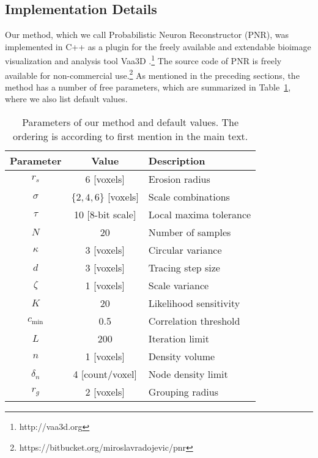 \subsection{Implementation Details}
\label{subsec:implementation}
Our method, which we call Probabilistic Neuron Reconstructor (PNR), was implemented in C++ as a plugin for the freely available and extendable bioimage visualization and analysis tool Vaa3D \citep{peng2010v3d, peng2014extensible}.\footnote{http://vaa3d.org} The source code of PNR is freely available for non-commercial use.\footnote{https://bitbucket.org/miroslavradojevic/pnr} As mentioned in the preceding sections, the method has a number of free parameters, which are summarized in Table~\ref{tab:params}, where we also list default values.

\begin{table}[t!]
\small\centering
\begin{tabular}{@{}c@{\hspace{1em}}c@{\hspace{2em}}l@{}}
\hline
Parameter & Value & Description \\
\hline
$r_s$ & 6 [voxels] & Erosion radius \\
$\sigma$ & $\{ 2,4,6 \}$ [voxels]  & Scale combinations \\ %
$\tau$ & 10 [8-bit scale] & Local maxima tolerance \\ %
$N$ & 20 & Number of samples \\
$\kappa$ & 3 [voxels] & Circular variance \\
$d$ & 3 [voxels] & Tracing step size \\
$\zeta$ & 1 [voxels] & Scale variance \\
$K$ & 20 & Likelihood sensitivity \\
$c_{\text{min}}$ & 0.5 & Correlation threshold \\ %
$L$ & 200 & Iteration limit \\
$n$ & 1 [voxels] & Density volume \\
$\delta_n$ & 4 [count/voxel] & Node density limit \\
$r_g$ & 2 [voxels] & Grouping radius \\
\hline
\end{tabular}
\caption{Parameters of our method and default values. The ordering is according to first mention in the main text.}
\label{tab:params}
\end{table}

